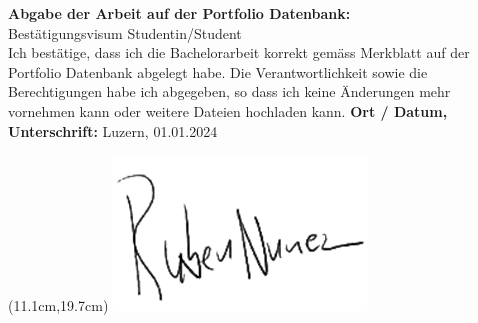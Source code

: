 \documentclass[main.tex]{subfiles} %
\begin{document}
\noindent
\textbf{Abgabe der Arbeit auf der Portfolio Datenbank:}\\
Bestätigungsvisum Studentin/Student\\
Ich bestätige, dass ich die Bachelorarbeit korrekt gemäss Merkblatt auf der Portfolio
Datenbank abgelegt habe. Die Verantwortlichkeit sowie die Berechtigungen habe ich abgegeben, so
dass ich keine Änderungen mehr vornehmen kann oder weitere Dateien hochladen kann.
\newline
\newline
\newline
\textbf{Ort / Datum, Unterschrift:} Luzern, 01.01.2024
\underline{\hspace*{4cm}}
\begin{textblock*}{12cm}(11.1cm,19.7cm)
\includegraphics[width=0.2\linewidth]{img/Unterschrift.png}
\end{textblock*}
\newline
\newline
\newline
\newline
\newline
\noindent
% 
% 
\end{document}

